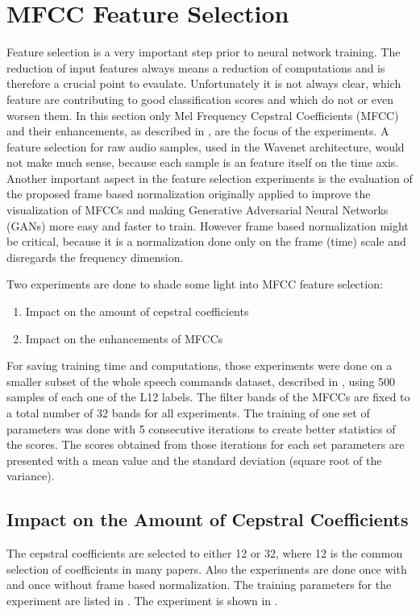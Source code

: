 
\section{MFCC Feature Selection}\label{sec:exp_fs}
\thesisStateNotReady
Feature selection is a very important step prior to neural network training.
The reduction of input features always means a reduction of computations and is therefore a crucial point to evaulate.
Unfortunately it is not always clear, which feature are contributing to good classification scores and which do not or even worsen them.
In this section only Mel Frequency Cepstral Coefficients (MFCC) and their enhancements, as described in , are the focus of the experiments.
A feature selection for raw audio samples, used in the Wavenet architecture, would not make much sense, because each sample is an feature itself on the time axis.
Another important aspect in the feature selection experiments is the evaluation of the proposed frame based normalization  originally applied to improve the visualization of MFCCs and making Generative Adversarial Neural Networks (GANs) more easy and faster to train.
However frame based normalization might be critical, because it is a normalization done only on the frame (time) scale and disregards the frequency dimension.

Two experiments are done to shade some light into MFCC feature selection:
\begin{enumerate}
    \item Impact on the amount of cepstral coefficients
    \item Impact on the enhancements of MFCCs
\end{enumerate}
For saving training time and computations, those experiments were done on a smaller subset of the whole speech commands dataset, described in , using 500 samples of each one of the L12 labels.
The filter bands of the MFCCs are fixed to a total number of 32 bands for all experiments.
The training of one set of parameters was done with 5 consecutive iterations to create better statistics of the scores.
The scores obtained from those iterations for each set parameters are presented with a mean value and the standard deviation (square root of the variance).



\subsection{Impact on the Amount of Cepstral Coefficients}
The cepstral coefficients are selected to either 12 or 32, where 12 is the common selection of coefficients in many papers.
Also the experiments are done once with and once without frame based normalization.
The training parameters for the experiment are listed in .
The experiment is shown in .
%


